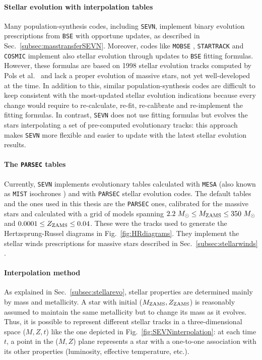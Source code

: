 \documentclass[a4paper,titlepage]{book}     	%
\newcommand{\sun}{\ensuremath{_\odot}}
\newcommand{\mzams}{M_\textup{ZAMS}}
\newcommand{\zzams}{Z_\textup{ZAMS}}
\newcommand{\msun}{\ensuremath{M\sun}}
\begin{document}
\paragraph{Stellar evolution with interpolation tables} Many population-synthesis codes, including \texttt{SEVN}, implement binary evolution prescriptions from \texttt{BSE} with opportune updates, as described in Sec.\ \ref{subsec:masstransferSEVN}. Moreover, codes like \texttt{MOBSE} \cite{giacobbomapelli2018_mobse_fryer}, \texttt{STARTRACK} \cite{Belczynski2010_WRwindsSTARTRACK} and \texttt{COSMIC} \cite{breivik2020cosmicpopsynth} implement also stellar evolution through updates to \texttt{BSE} fitting formulas. However, these formulas are based on 1998 stellar evolution tracks computed by Pols et al.\ \cite{Pols1998evotracks} and lack a proper evolution of massive stars, not yet well-developed at the time. In addition to this, similar population-synthesis codes are difficult to keep consistent with the most-updated stellar evolution indications because every change would require to re-calculate, re-fit, re-calibrate and re-implement the fitting formulas. In contrast, \texttt{SEVN} does not use fitting formulas but evolves the stars interpolating a set of pre-computed evolutionary tracks: this approach makes \texttt{SEVN} more flexible and easier to update with the latest stellar evolution results.

\paragraph{The \texttt{PARSEC} tables} Currently, \texttt{SEVN} implements evolutionary tables calculated with \texttt{MESA} (also known as \texttt{MIST} isochrones \cite{MIST_Choi2016}) and with \texttt{PARSEC} \cite{parsec2015_chen} stellar evolution codes. The default tables and the ones used in this thesis are the \texttt{PARSEC} ones, calibrated for the massive stars and calculated with a grid of models spanning $2.2~\msun \leq \mzams \leq 350~\msun$ and $0.0001 \leq \zzams \leq 0.04$. These were the tracks used to generate the Hertzsprung-Russel diagrams in Fig.\ \ref{fig:HRdiagrams}. They implement the stellar winds prescriptions for massive stars described in Sec.\ \ref{subsec:stellarwinds} \cite{parsec2015_chen}. 

\paragraph{Interpolation method} As explained in Sec.\ \ref{subsec:stellarevo}, stellar properties are determined mainly by mass and metallicity. A star with initial ($\mzams,\zzams$) is reasonably assumed to maintain the same metallicity but to change its mass as it evolves. Thus, it is possible to represent different stellar tracks in a three-dimensional space ($M,Z,t$) like the one depicted in Fig.\ \ref{fig:SEVNinterpolation}: at each time $t$, a point in the ($M,Z$) plane represents a star with a one-to-one association with its other properties (luminosity, effective temperature, etc.).
\end{document}
